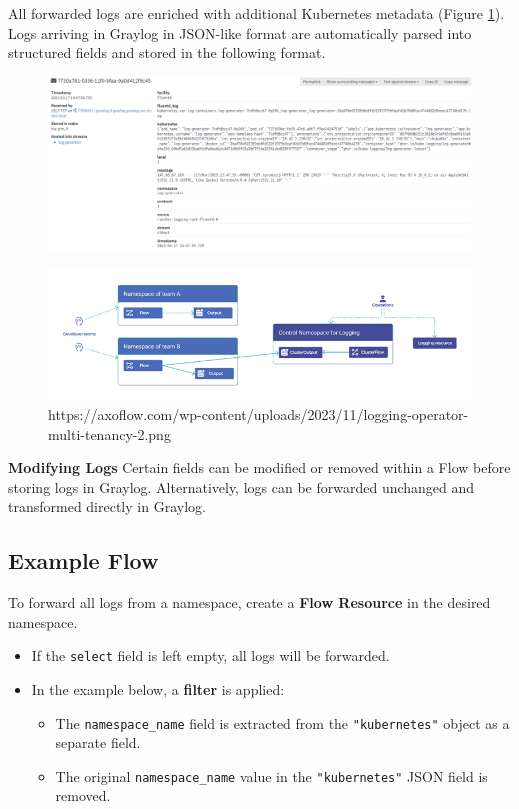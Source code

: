 \documentclass[../main.tex]{subfiles}
\begin{document}
All forwarded logs are enriched with additional Kubernetes metadata (Figure \ref{fig:message}). Logs arriving in Graylog in JSON-like format are automatically parsed into structured fields and stored in the following format.

\begin{figure}[h]
        \centering
        \includegraphics[scale=0.6]{img/3-background/centralized_logging/message.png}
        \caption{ }
        \label{fig:message}
\end{figure}


\begin{figure}[h]
        \centering
        \includegraphics[]{img/3-background/centralized_logging/log_operator_flows.png}
        \caption{https://axoflow.com/wp-content/uploads/2023/11/logging-operator-multi-tenancy-2.png }
        \label{fig:log_operator_flows}
\end{figure}


\textbf{Modifying Logs}
Certain fields can be modified or removed within a Flow before storing logs in Graylog. Alternatively, logs can be forwarded unchanged and transformed directly in Graylog.

\subsection{Example Flow}
To forward all logs from a namespace, create a \textbf{Flow Resource} in the desired namespace.

\begin{itemize}
    \item If the \texttt{select} field is left empty, all logs will be forwarded.
    \item In the example below, a \textbf{filter} is applied:
    \begin{itemize}
        \item The \texttt{namespace\_name} field is extracted from the \texttt{"kubernetes"} object as a separate field.
        \item The original \texttt{namespace\_name} value in the \texttt{"kubernetes"} JSON field is removed.
    \end{itemize}
\end{itemize}
\end{document}
